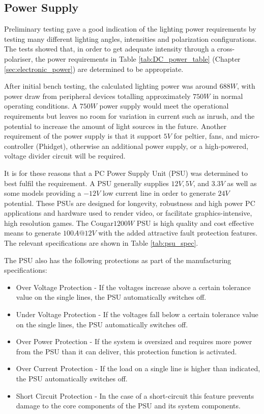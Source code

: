 \documentclass[fleqn,twoside,12pt]{report}
\begin{document}
\subsection{Power Supply}


Preliminary testing gave a good indication of the lighting power requirements by testing many different lighting angles, intensities and polarization configurations. The tests showed that, in order to get adequate intensity through a cross-polariser, the power requirements in Table \ref{tab:DC_power_table} (Chapter \ref{sec:electronic_power}) are determined to be appropriate.

After initial bench testing, the calculated lighting power was around $688W$, with power draw from peripheral devices totalling approximately $750W$ in normal operating conditions. A $750W$ power supply would meet the operational requirements but leaves no room for variation in current such as inrush, and the potential to increase the amount of light sources in the future. Another requirement of the power supply is that it support $5V$ for peltier, fans, and micro-controller (Phidget), otherwise an additional power supply, or a high-powered, voltage divider circuit will be required.

It is for these reasons that a PC Power Supply Unit (PSU) was determined to best fulfil the requirement. A PSU generally supplies $12V, 5V$, and $3.3V$ as well as some models providing a $-12V$ low current line in order to generate $24V$ potential. These PSUs are designed for longevity, robustness and high power PC applications and hardware used to render video, or facilitate graphics-intensive, high resolution games. The Cougar\textregistered $1200W$ PSU is high quality and cost effective means to generate $100A @ 12V$ with the added attractive fault protection features. The relevant specifications are shown in Table \ref{tab:psu_spec}.


The PSU also has the following protections as part of the manufacturing specifications:

\begin{itemize}
	\item Over Voltage Protection - If the voltages increase above a certain tolerance value on the single lines, the PSU automatically switches off.
	\item Under Voltage Protection - If the voltages fall below a certain tolerance value on the single lines, the PSU automatically switches off.
	\item Over Power Protection - If the system is oversized and requires more power from the PSU than it can deliver, this protection function is activated.
	\item Over Current Protection - If the load on a single line is higher than indicated, the PSU automatically switches off.
	\item Short Circuit Protection - In the case of a short-circuit this feature prevents damage to the core components of the PSU and its system components.
\end{itemize}
\end{document}
